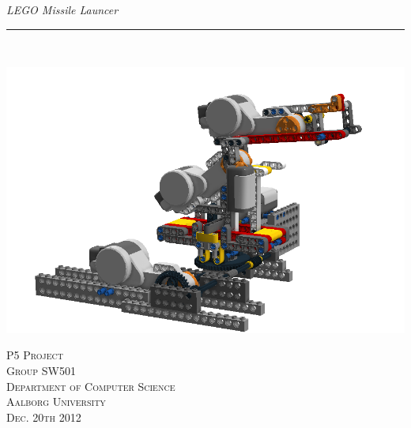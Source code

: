 \thispagestyle{empty}
\begin{flushright}
\vspace{3cm}

\phantom{hul}

\phantom{hul}

\phantom{hul}

\textsl{\Huge LEGO Missile Launcer} \\ \vspace{1cm}

\rule{13cm}{3mm} \\ \vspace{1.5cm}
\vspace{1cm}

\includegraphics[width=1.0\textwidth]{img/design_turret4} 

\vspace{1.5cm} 
\textsc{\Large P5 Project \\
Group SW501 \\
Department of Computer Science\\
Aalborg University\\
Dec. 20th 2012\\}
\end{flushright}
